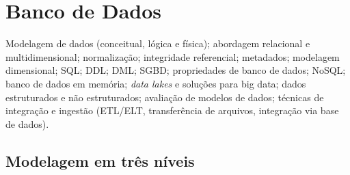 \chapter{Banco de Dados}
\label{cap:banco-dados-teoria}

\begin{edital}
Modelagem de dados (conceitual, lógica e física); abordagem relacional e
multidimensional; normalização; integridade referencial; metadados;
modelagem dimensional; SQL; DDL; DML; SGBD; propriedades de banco de dados;
NoSQL; banco de dados em memória; \textit{data lakes} e soluções para big
data; dados estruturados e não estruturados; avaliação de modelos de dados;
técnicas de integração e ingestão (ETL/ELT, transferência de arquivos,
integração via base de dados).
\end{edital}

\section{Modelagem em três níveis}

